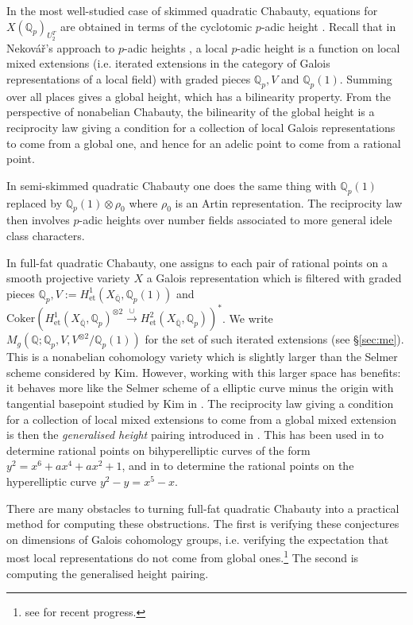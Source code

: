 \documentclass[11pt]{amsart}
\def\Q{\mathbb Q}
\newcommand{\Coker}{\mathrm{Coker}}
\theoremstyle{plain}
\theoremstyle{definition}
\newcommand{\et}{\mathrm{et}}
\begin{document}
In the most well-studied case of skimmed quadratic Chabauty, equations for $X(\Q _p )_{U_2 ^T}$ are obtained in terms of the cyclotomic $p$-adic height \cite{nekovar}. Recall that in Nekov\'a\v r's approach to $p$-adic heights \cite{nekovar}, a local $p$-adic height is a function on local mixed extensions (i.e. iterated extensions in the category of Galois representations of a local field) with graded pieces $\Q _p ,V$ and $\Q _p (1)$. Summing over all places gives a global height, which has a bilinearity property. From the perspective of nonabelian Chabauty, the bilinearity of the global height is a reciprocity law giving a condition for a collection of local Galois representations to come from a global one, and hence for an adelic point to come from a rational point.

In semi-skimmed quadratic Chabauty one does the same thing with $\Q _p (1)$ replaced by $\Q _p (1)\otimes \rho _0 $ where $\rho _0$ is an Artin representation. The reciprocity law then involves $p$-adic heights over number fields associated to more general idele class characters. 

In full-fat quadratic Chabauty, one assigns to each pair of rational points on a smooth projective variety $X$ a Galois representation which is filtered with graded pieces $\Q _p ,V:=H^1 _{\et }(X_{\overline{\Q}},\Q _p (1))$ and $\Coker (H^1 _{\et }(X_{\overline{\Q}},\Q _p )^{\otimes 2}\stackrel{\cup }{\longrightarrow }H^2 _{\et }(X_{\overline{\Q }},\Q _p ))^* $. We write $M_g (\Q ;\Q _p ,V,V^{\otimes 2}/\Q _p (1))$ for the set of such iterated extensions (see \S \ref{sec:me}). This is a nonabelian cohomology variety which is slightly larger than the Selmer scheme considered by Kim. However, working with this larger space has benefits: it behaves more like the Selmer scheme of a elliptic curve minus the origin with tangential basepoint studied by Kim in \cite{kim:massey}. The reciprocity law giving a condition for a collection of local mixed extensions to come from a global mixed extension is then the \textit{generalised height} pairing introduced in \cite{QC2}. This has been used in \cite{QC2} to determine rational points on bihyperelliptic curves of the form $y^2 =x^6+ax^4+ax^2 +1$, and in \cite{dogra2023} to determine the rational points on the hyperelliptic curve $y^2-y=x^5-x$. 

There are many obstacles to turning full-fat quadratic Chabauty into a practical method for computing these obstructions. The first is verifying these conjectures on dimensions of Galois cohomology groups, i.e. verifying the expectation that most local representations do not come from global ones.\footnote{see \cite{berry2025refined} for recent progress.} The second is computing the generalised height pairing.
\end{document}
